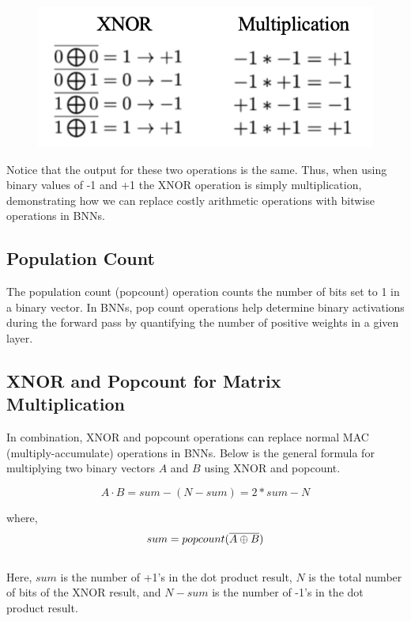 
\begin{figure}[htbp]
\centerline{\includegraphics[scale = .65]{images/comparison.png}}
\label{fig:comparison}
\end{figure}


Notice that the output for these two operations is the same. Thus, when using binary values of -1 and +1 the XNOR operation is simply multiplication, demonstrating how we can replace costly arithmetic operations with bitwise operations in BNNs. 


\subsection{Population Count}
The population count (popcount) operation counts the number of bits set to 1 in a binary vector. In BNNs, pop count operations help determine binary activations during the forward pass by quantifying the number of positive weights in a given layer. 

\subsection{XNOR and Popcount for Matrix Multiplication}
In combination, XNOR and popcount operations can replace normal MAC (multiply-accumulate) operations in BNNs. Below is the general formula for multiplying two binary vectors $A$ and $B$ using XNOR and popcount.

\begin{equation}
    A \cdot B = sum - (N-sum) = 2*sum - N 
\end{equation}

where, 
\begin{equation}
sum = popcount(\overline{A \oplus B}) \\
\end{equation}\\


Here, $sum$ is the number of +1's in the dot product result, $N$ is the total number of bits of the XNOR result, and $N-sum$ is the number of -1's in the dot product result. \\

